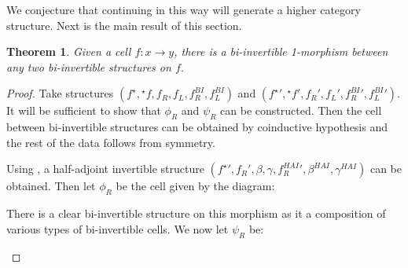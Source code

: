 \documentclass[draft]{article}
\newtheorem{theorem}{Theorem} \newtheorem{prop}[theorem]{Proposition}
\newcommand{\linv}[1]{{}^\star\!#1} \newcommand{\rinv}[1]{#1^\star}
\begin{document}
We conjecture that continuing in this way will generate a higher
category structure. Next is the main result of this section.

\begin{theorem}
  Given a cell \(f : x \to y\), there is a bi-invertible 1-morphism
  between any two bi-invertible structures on \(f\).
\end{theorem}

\begin{proof}
  Take structures \((\rinv f, \linv f, f_R, f_L, f_R^{BI}, f_L^{BI})\)
  and \((\rinv f{}' , \linv f{}', f_R', f_L', f_R^{BI}{}', f_L^{BI}{}')\).
  It will be sufficient to show that \(\phi_R\) and \(\psi_R\) can be
  constructed. Then the cell between bi-invertible structures can be
  obtained by coinductive hypothesis and the rest of the data follows
  from symmetry.

  Using , a half-adjoint invertible
  structure \((\rinv f{}', f_R', \beta, \gamma, f_R^{HAI}{}', \beta^{HAI}, \gamma^{HAI})\) can be obtained.
  Then let \(\phi_R\) be the cell given by the diagram:
  \begin{center}
  \end{center}
  There is a clear bi-invertible structure on this morphism as it a
  composition of various types of bi-invertible cells. We now let
  \(\psi_R\) be:
  \begin{center}
\end{center}
\end{proof}
\end{document}
